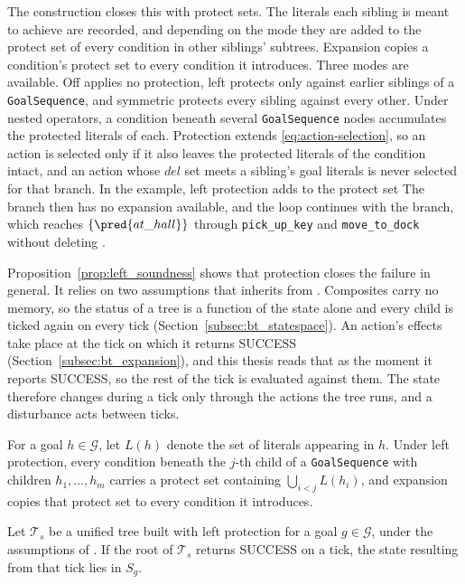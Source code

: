     The construction closes this with protect sets.
    The literals each sibling is meant to achieve are recorded, and depending on the mode they are added to the protect set of every condition in other siblings' subtrees.
    Expansion copies a condition's protect set to every condition it introduces.
    Three modes are available.
    Off applies no protection, left protects only against earlier siblings of a \texttt{GoalSequence}, and symmetric protects every sibling against every other.
    Under nested operators, a condition beneath several \texttt{GoalSequence} nodes accumulates the protected literals of each.
    Protection extends \eqref{eq:action-selection}, so an action is selected only if it also leaves the protected literals of the condition intact, and an action whose $del$ set meets a sibling's goal literals is never selected for that branch.
    In the example, left protection adds  to the protect set
    The  branch then has no expansion available, and the loop continues with the  branch, which reaches $\{\pred{at\_hall}\}$ through \texttt{pick\_up\_key} and \texttt{move\_to\_dock} without deleting .

    Proposition~\ref{prop:left_soundness} shows that protection closes the failure in general.
    It relies on two assumptions that \probprime inherits from \probone.
    Composites carry no memory, so the status of a tree is a function of the state alone and every child is ticked again on every tick (Section~\ref{subsec:bt_statespace}).
    An action's effects take place at the tick on which it returns SUCCESS (Section~\ref{subsec:bt_expansion}), and this thesis reads that as the moment it reports SUCCESS, so the rest of the tick is evaluated against them.
    The state therefore changes during a tick only through the actions the tree runs, and a disturbance acts between ticks.

    For a goal $h \in \mathcal{G}$, let $L(h)$ denote the set of literals appearing in $h$.
    Under left protection, every condition beneath the $j$-th child of a \texttt{GoalSequence} with children $h_1, \ldots, h_m$ carries a protect set containing $\bigcup_{i<j} L(h_i)$, and expansion copies that protect set to every condition it introduces.

    \begin{proposition}
    \label{prop:left_soundness}
        Let $\mathcal{T}_s$ be a unified tree built with left protection for a goal $g \in \mathcal{G}$, under the assumptions of \probprime.
        If the root of $\mathcal{T}_s$ returns SUCCESS on a tick, the state resulting from that tick lies in $S_g$.
    \end{proposition}

